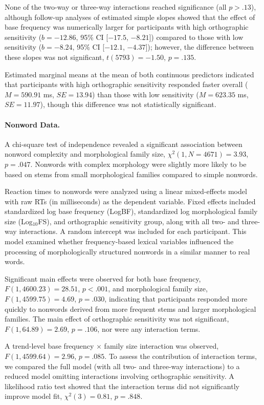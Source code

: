 \documentclass[preprint,12pt, authoryear, review]{elsarticle}
\begin{document}
None of the two-way or three-way interactions reached significance (all $p > .13$), although follow-up analyses of estimated simple slopes showed that the effect of base frequency was numerically larger for participants with high orthographic sensitivity ($b = -12.86$, 95\% CI [$-17.5$, $-8.21$]) compared to those with low sensitivity ($b = -8.24$, 95\% CI [$-12.1$, $-4.37$]); however, the difference between these slopes was not significant, $t(5793) = -1.50$, $p = .135$.

Estimated marginal means at the mean of both continuous predictors indicated that participants with high orthographic sensitivity responded faster overall ($M = 590.91$ ms, $SE = 13.94$) than those with low sensitivity ($M = 623.35$ ms, $SE = 11.97$), though this difference was not statistically significant.

\paragraph{Nonword Data.} 

A chi-square test of independence revealed a significant association between nonword complexity and morphological family size, $\chi^2(1, N = 4671) = 3.93$, $p = .047$. Nonwords with complex morphology were slightly more likely to be based on stems from small morphological families compared to simple nonwords.

Reaction times to nonwords were analyzed using a linear mixed-effects model with raw RTs (in milliseconds) as the dependent variable. Fixed effects included standardized log base frequency (LogBF), standardized log morphological family size (Log$_{10}$FS), and orthographic sensitivity group, along with all two- and three-way interactions. A random intercept was included for each participant. This model examined whether frequency-based lexical variables influenced the processing of morphologically structured nonwords in a similar manner to real words.

Significant main effects were observed for both base frequency, $F(1, 4600.23) = 28.51$, $p < .001$, and morphological family size, $F(1, 4599.75) = 4.69$, $p = .030$, indicating that participants responded more quickly to nonwords derived from more frequent stems and larger morphological families. The main effect of orthographic sensitivity was not significant, $F(1, 64.89) = 2.69$, $p = .106$, nor were any interaction terms.

A trend-level base frequency $\times$ family size interaction was observed, $F(1, 4599.64) = 2.96$, $p = .085$. To assess the contribution of interaction terms, we compared the full model (with all two- and three-way interactions) to a reduced model omitting interactions involving orthographic sensitivity. A likelihood ratio test showed that the interaction terms did not significantly improve model fit, $\chi^2(3) = 0.81$, $p = .848$.
\end{document}
